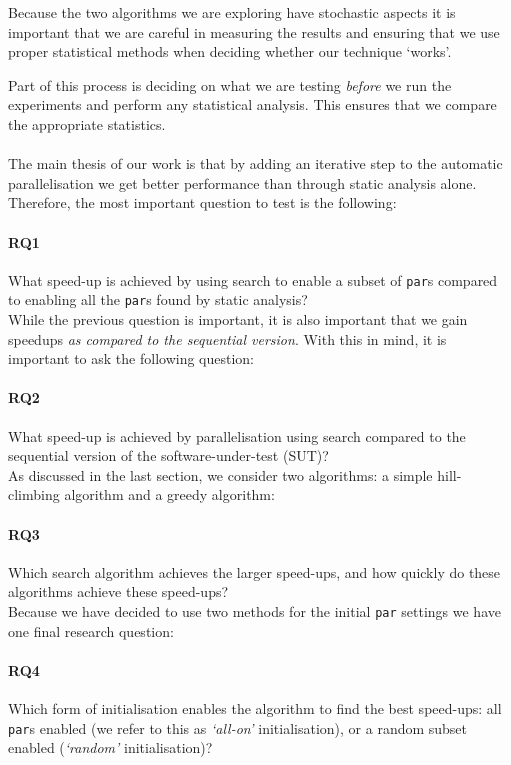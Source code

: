 Because the two algorithms we are exploring have stochastic aspects it is
important that we are careful in measuring the results and ensuring that we
use proper statistical methods when deciding whether our technique `works'.

Part of this process is deciding on what we are testing \emph{before} we run
the experiments and perform any statistical analysis. This ensures that we
compare the appropriate statistics.

\paragraph{}

The main thesis of our work is that by adding an iterative step to the
automatic parallelisation we get better performance than through static
analysis alone. Therefore, the most important question to test is the following:

\paragraph{RQ1} What speed-up is achieved by using search to enable a
subset of \verb-par-s compared to enabling all the \verb-par-s found by
static analysis?\\


\noindent
While the previous question is important, it is also important that we gain
speedups \emph{as compared to the sequential version}. With this in mind, it is
important to ask the following question:

\paragraph{RQ2} What speed-up is achieved by parallelisation using search
compared to the sequential version of the software-under-test (SUT)?\\


\noindent
As discussed in the last section, we consider two algorithms: a simple
hill-climbing algorithm and a greedy algorithm:

\paragraph{RQ3} Which search algorithm achieves the larger speed-ups, and
how quickly do these algorithms achieve these speed-ups?\\

\noindent
Because we have decided to use two methods for the initial \verb|par| settings
we have one final research question:

\paragraph{RQ4} Which form of initialisation enables the algorithm to
find the best speed-ups: all \verb-par-s enabled (we refer to this as
\emph{`all-on'} initialisation), or a random subset enabled (\emph{`random'}
initialisation)?
